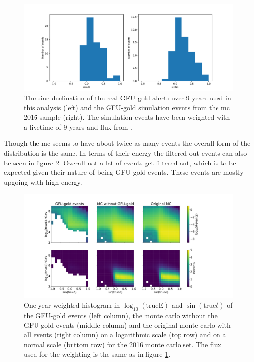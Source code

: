 \begin{figure}
    \centering
    \includegraphics[width=\linewidth]{Plots/03_data/gfu_gold_comp.pdf}
    \caption{The sine declination of the real GFU-gold alerts over 9 years used in this analysis (left) and the GFU-gold simulation events from the mc 2016 sample (right). The simulation events have been weighted with a livetime of 9 years and flux from \cite{flux}.}
    \label{fig:gfu_gold_comp}
\end{figure}
Though the mc seems to have about twice as many events the overall form of the distribution is the same.
In terms of their energy the filtered out events can also be seen in figure \ref{fig:energy}.
Overall not a lot of events get filtered out, which is to be expected given their nature of being GFU-gold events.
These events are mostly upgoing with high energy.
\begin{figure}
    \centering
    \includegraphics[width=16cm]{Plots/03_data/cleaned_mc_energy_test.pdf}
    \caption{One year weighted histogram in $\log_{10}(\text{trueE})$ and $\sin{(\text{true}\delta)}$ of the GFU-gold events (left column), the monte carlo without the GFU-gold events (middle column) and the original monte carlo with all events (right column) on a logarithmic scale (top row) and on a normal scale (buttom row) for the 2016 monte carlo set. The flux used for the weighting is the same as in figure \ref{fig:gfu_gold_comp}.}
    \label{fig:energy}
\end{figure}
